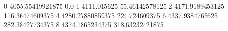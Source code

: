 0 4055.55419921875 0.0
1 4111.015625 55.46142578125
2 4171.9189453125 116.36474609375
4 4280.27880859375 224.724609375
6 4337.9384765625 282.38427734375
8 4374.1865234375 318.63232421875
